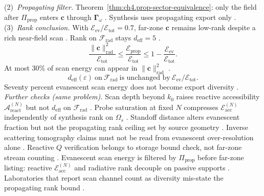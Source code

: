 (2)~\emph{Propagating filter.} Theorem~\ref{thm:ch4.prop-sector-equivalence}: only the field after $\Pi_{\mathrm{prop}}$ enters $\mathbf{c}$ through $\boldsymbol{\Gamma}_\omega$ . Synthesis uses propagating export only .
(3)~\emph{Rank conclusion.} With $\mathcal{E}_{\mathrm{ev}}/\mathcal{E}_{\mathrm{tot}}=0.7$, far-zone $\mathbf{c}$ remains low-rank despite a rich near-field scan . Rank on $\mathcal{F}_{\mathrm{rad}}$ stays $d_{\mathrm{eff}}=5$ .
\begin{equation}
\label{eq:ch4.ex-nf-ff-energy}
\frac{\|\mathbf{c}\|_{\mathrm{rad}}^{2}}{\mathcal{E}_{\mathrm{tot}}}
\le
\frac{\mathcal{E}_{\mathrm{prop}}}{\mathcal{E}_{\mathrm{tot}}}
\le
1-\frac{\mathcal{E}_{\mathrm{ev}}}{\mathcal{E}_{\mathrm{tot}}}.
\end{equation}
At most $30\%$ of scan energy can appear in $\|\mathbf{c}\|_{\mathrm{rad}}^{2}$ .
\begin{equation}
\label{eq:ch4.ex-ev-fraction-rank}
d_{\mathrm{eff}}(\varepsilon)\ \text{on}\ \mathcal{F}_{\mathrm{rad}}\ \text{is unchanged by}\ \mathcal{E}_{\mathrm{ev}}/\mathcal{E}_{\mathrm{tot}}.
\end{equation}
Seventy percent evanescent scan energy does not become export diversity .
\emph{Further checks (same problem).} Scan depth beyond $k_{0}$ raises reactive accessibility $\mathcal{A}_{\mathrm{react}}^{(N)}$ but not $d_{\mathrm{eff}}$ on $\mathcal{F}_{\mathrm{rad}}$ . Probe saturation at fixed $N$ compresses $\mathcal{E}_{\mathrm{acc}}^{(N)}$ independently of synthesis rank on $\Omega_{s}$ . Standoff distance alters evanescent fraction but not the propagating rank ceiling set by source geometry . Inverse scattering tomography claims must not be read from evanescent over-resolution alone . Reactive $Q$ verification belongs to storage bound check, not far-zone stream counting .
Evanescent scan energy is filtered by $\Pi_{\mathrm{prop}}$ before far-zone listing: reactive $\mathcal{E}_{\mathrm{acc}}^{(N)}$ and radiative rank decouple on passive supports . Laboratories that report scan channel count as diversity mis-state the propagating rank bound .
